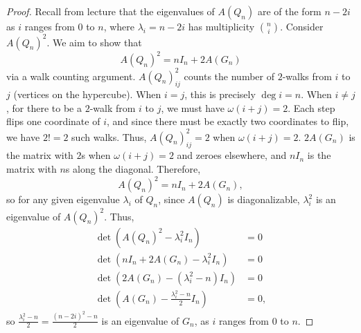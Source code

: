 \documentclass[11pt]{scrartcl}
\begin{document}
\begin{proof}
    Recall from lecture that the eigenvalues of $A(Q_n)$ are of the form $n-2i$ as $i$ ranges from $0$ to $n$, where $\lambda_i=n-2i$ has multiplicity $\binom{n}{i}$. Consider $A(Q_n)^2$. We aim to show that \[A(Q_n)^2=nI_n+2A(G_n)\] via a walk counting argument. $A(Q_n)^2_{ij}$ counts the number of $2$-walks from $i$ to $j$ (vertices on the hypercube). When $i=j$, this is precisely $\deg i=n$. When $i\neq j$, for there to be a $2$-walk from $i$ to $j$, we must have $\omega(i+j)=2$. Each step flips one coordinate of $i$, and since there must be exactly two coordinates to flip, we have $2!=2$ such walks. Thus, $A(Q_n)^2_{ij}=2$ when $\omega(i+j)=2$. $2A(G_n)$ is the matrix with $2$s when $\omega(i+j)=2$ and zeroes elsewhere, and $nI_n$ is the matrix with $n$s along the diagonal. Therefore, \[A(Q_n)^2=nI_n+2A(G_n),\] so for any given eigenvalue $\lambda_i$ of $Q_n$, since $A(Q_n)$ is diagonalizable, $\lambda_i^2$ is an eigenvalue of $A(Q_n)^2$. Thus,
    \begin{align*}
        \det(A(Q_n)^2-\lambda_i^2I_n)&=0\\
        \det(nI_n+2A(G_n)-\lambda_i^2I_n)&=0\\
        \det(2A(G_n)-(\lambda_i^2-n)I_n)&=0\\
        \det\left(A(G_n)-\frac{\lambda_i^2-n}{2}I_n\right)&=0,
    \end{align*} 
    so $\frac{\lambda_i^2-n}{2}=\frac{(n-2i)^2-n}{2}$ is an eigenvalue of $G_n$, as $i$ ranges from $0$ to $n$.
\end{proof}
\end{document}
